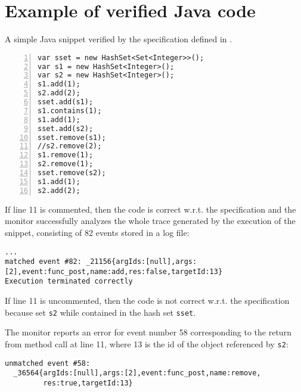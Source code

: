 \appendix
\section{Example of verified Java code}\label{appendix}

A simple Java snippet verified by the \rml specification defined in .
\begin{lstlisting}[numbers=left]
var sset = new HashSet<Set<Integer>>();
var s1 = new HashSet<Integer>();
var s2 = new HashSet<Integer>();
s1.add(1);
s2.add(2);
sset.add(s1);
s1.contains(1);
s1.add(1);
sset.add(s2);
sset.remove(s1);
//s2.remove(2);
s1.remove(1);
s2.remove(1);
sset.remove(s2);
s1.add(1);
s2.add(2);
\end{lstlisting}
If line 11 is commented, then the code is correct w.r.t. the specification and the monitor successfully analyzes the whole trace generated by the execution of the snippet, consisting of 82 events stored in a log file:
\begin{lstlisting}[language={},basicstyle=\ttfamily\scriptsize]
...
matched event #82: _21156{argIds:[null],args:[2],event:func_post,name:add,res:false,targetId:13}
Execution terminated correctly
\end{lstlisting}

If line 11 is uncommented, then the code is not correct w.r.t. the specification because set \lstinline{s2} while
contained in the hash set \lstinline{sset}.

The monitor reports an error for event number 58 corresponding to the return from method call
at line 11, where 13 is the id of the object referenced by \lstinline{s2}:
\begin{lstlisting}[language={},basicstyle=\ttfamily\scriptsize]
unmatched event #58:
  _36564{argIds:[null],args:[2],event:func_post,name:remove,
         res:true,targetId:13}
\end{lstlisting}
